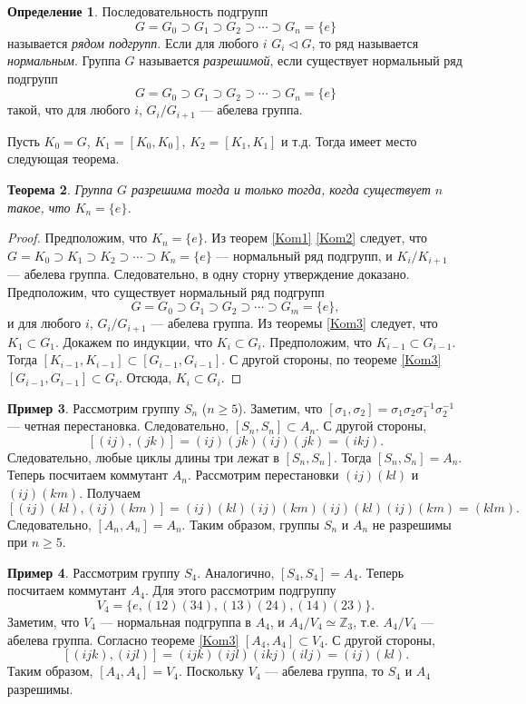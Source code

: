 \documentclass[12pt, titlepage, oneside]{amsbook}
\newcommand{\ZZ}{\mathbb{Z}}
\newtheorem{theorem}{Теорема}[chapter]
\theoremstyle{definition}
\newtheorem{example}[theorem]{Пример}
\newtheorem{definition}[theorem]{Определение}
\theoremstyle{remark}
\begin{document}
\begin{definition}
Последовательность подгрупп $$G=G_0\supset G_1\supset G_2\supset\cdots\supset G_n=\{e\}$$ называется \emph{рядом подгрупп}. Если для любого $i$ $G_{i}\triangleleft G$, то ряд называется \emph{нормальным}.
Группа $G$ называется \emph{разрешимой}, если существует нормальный ряд подгрупп $$G=G_0\supset G_1\supset G_2\supset\cdots\supset G_n=\{e\}$$ такой, что для любого $i$, $G_i/G_{i+1}$ --- абелева группа.
\end{definition}

Пусть $K_0=G$, $K_1=[K_0,K_0]$, $K_2=[K_1,K_1]$ и т.д. Тогда имеет место следующая теорема.

\begin{theorem}
\label{Raz1}
Группа $G$ разрешима тогда и только тогда, когда существует $n$ такое, что $K_n=\{e\}$.
\end{theorem}

\begin{proof}
Предположим, что $K_n=\{e\}$. Из теорем \ref{Kom1} \ref{Kom2} следует, что $G=K_0\supset K_1\supset K_2\supset\cdots\supset K_n=\{e\}$ --- нормальный ряд подгрупп, и $K_i/K_{i+1}$ --- абелева группа. Следовательно, в одну сторну утверждение доказано. Предположим, что существует нормальный ряд подгрупп $$G=G_0\supset G_1\supset G_2\supset\cdots\supset G_m=\{e\},$$ и для любого $i$, $G_i/G_{i+1}$ --- абелева группа. Из теоремы \ref{Kom3} следует, что $K_1\subset G_1$. Докажем по индукции, что $K_i\subset G_i$. Предположим, что $K_{i-1}\subset G_{i-1}$. Тогда $[K_{i-1},K_{i-1}]\subset[G_{i-1},G_{i-1}]$. С другой стороны, по теореме \ref{Kom3} $[G_{i-1},G_{i-1}]\subset G_i$. Отсюда, $K_i\subset G_i$.
\end{proof}

\begin{example}
Рассмотрим группу $S_n$ ($n\geq 5$). Заметим, что $[\sigma_1,\sigma_2]=\sigma_1\sigma_2\sigma^{-1}_1\sigma^{-1}_2$ --- четная перестановка. Следовательно, $[S_n,S_n]\subset A_n$. С другой стороны, $$[(ij),(jk)]=(ij)(jk)(ij)(jk)=(ikj).$$ Следовательно, любые циклы длины три лежат в $[S_n,S_n]$. Тогда $[S_n,S_n]=A_n$. Теперь посчитаем коммутант $A_n$. Рассмотрим перестановки $(ij)(kl)$ и $(ij)(km)$. Получаем $$[(ij)(kl),(ij)(km)]=(ij)(kl)(ij)(km)(ij)(kl)(ij)(km)=(klm).$$ Следовательно, $[A_n,A_n]=A_n$. Таким образом, группы $S_n$ и $A_n$ не разрешимы при $n\geq 5$.
\end{example}

\begin{example}
Рассмотрим группу $S_4$. Аналогично, $[S_4,S_4]=A_4$. Теперь посчитаем коммутант $A_4$. Для этого рассмотрим подгруппу $$V_4=\{e,(12)(34),(13)(24),(14)(23)\}.$$ Заметим, что $V_4$ --- нормальная подгруппа в $A_4$, и $A_4/V_4\simeq\ZZ_3$, т.е. $A_4/V_4$ --- абелева группа. Согласно теореме \ref{Kom3} $[A_4,A_4]\subset V_4$. С другой стороны, $$[(ijk),(ijl)]=(ijk)(ijl)(ikj)(ilj)=(ij)(kl).$$ Таким образом, $[A_4,A_4]=V_4$. Поскольку $V_4$ --- абелева группа, то $S_4$ и $A_4$ разрешимы.
\end{example}
\end{document}
